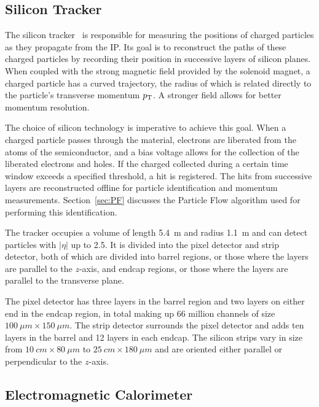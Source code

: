\subsection{Silicon Tracker\label{subsec:tracker}}

The silicon tracker~\cite{Karimaki:368412} is responsible for measuring the positions of charged particles as they propagate from the IP.
Its goal is to reconstruct the paths of these charged particles by recording their position
in successive layers of silicon planes.
When coupled with the strong magnetic field provided by the solenoid
magnet, a charged particle has a curved trajectory, the radius of which is related directly
to the particle's transverse momentum $p_{\rm T}$. A stronger field allows for
better momentum resolution.

The choice of silicon technology is imperative to achieve this goal. When a charged particle passes through the material, electrons are liberated from the atoms of the semiconductor, and a bias voltage
allows for the collection of the liberated electrons and holes.
If the charged collected during
a certain time window exceeds a specified threshold, a hit is registered.
The hits from successive layers
are reconstructed offline for particle identification and momentum measurements.
Section~\ref{sec:PF} discusses the Particle Flow algorithm used for performing this identification.

The tracker occupies a volume
of length 5.4~m and radius 1.1~m and can detect particles with $|\eta|$ up to 2.5. It is divided into
the pixel detector and strip detector, both of which are divided into barrel regions, or those
where the layers are parallel to the $z$-axis, and endcap regions, or those where the layers
are parallel to the transverse plane.

The pixel detector has three layers in the barrel region
and two layers on either end in the endcap region, in total making up 66 million channels of size
$100~\mu m \times 150~\mu m$. The strip detector surrounds the pixel detector and adds
ten layers in the barrel and 12 layers in each endcap. The silicon strips vary in size from
$10~cm \times 80~\mu m$ to $25~cm \times 180~\mu m$ and are oriented either parallel or perpendicular
to the $z$-axis.

\subsection{Electromagnetic Calorimeter\label{subsec:ecal}}

